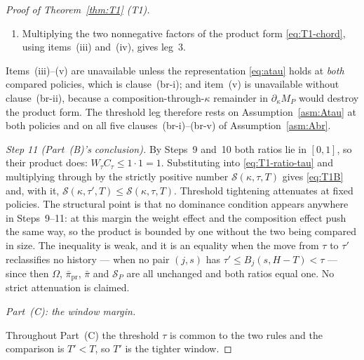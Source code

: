 \begin{proof}[Proof of Theorem~\ref{thm:T1} (T1)]
\begin{enumerate}[label=(\roman*),leftmargin=2.4em,itemsep=3pt]
  Assumption~\ref{asm:Abr}.
\item Multiplying the two nonnegative factors of the product form \eqref{eq:T1-chord}, using
  items~(iii) and~(iv), gives leg~3.
\end{enumerate}
Items~(iii)--(v) are unavailable unless the representation \eqref{eq:atau} holds at \emph{both}
compared policies, which is clause~(br-i); and item~(v) is unavailable without clause~(br-ii),
because a composition-through-$\kappa$ remainder in $\partial_\kappa M_P$ would destroy the product
form. The threshold leg therefore rests on Assumption~\ref{asm:Atau} at both policies and on all
five clauses~(br-i)--(br-v) of Assumption~\ref{asm:Abr}.

\emph{Step 11 (Part~(B)'s conclusion).} By Steps~9 and~10 both ratios lie in $[0,1]$, so their
product does: $W_\tau C_\tau \le 1\cdot 1 = 1$. Substituting into \eqref{eq:T1-ratio-tau} and
multiplying through by the strictly positive number $\mathcal S(\kappa,\tau,T)$ gives
\eqref{eq:T1B} and, with it,
$\mathcal S(\kappa,\tau',T) \le \mathcal S(\kappa,\tau,T)$. Threshold tightening attenuates at
fixed policies. The structural point is that no dominance condition appears anywhere in Steps~9--11:
at this margin the weight effect and the composition effect push the same way, so the product is
bounded by one without the two being compared in size. The inequality is weak, and it is an
equality when the move from $\tau$ to $\tau'$ reclassifies no history --- when no pair $(j,s)$ has
$\tau' \le B_j(s,H-T) < \tau$ --- since then $\Omega$, $\bar\pi_{\mathrm{pr}}$, $\bar\pi$ and
$\mathcal S_P$ are all unchanged and both ratios equal one. No strict attenuation is claimed.

\medskip
\noindent\emph{Part~(C): the window margin.}

Throughout Part~(C) the threshold $\tau$ is common to the two rules and the comparison is
$T' < T$, so $T'$ is the tighter window.


\end{proof}
